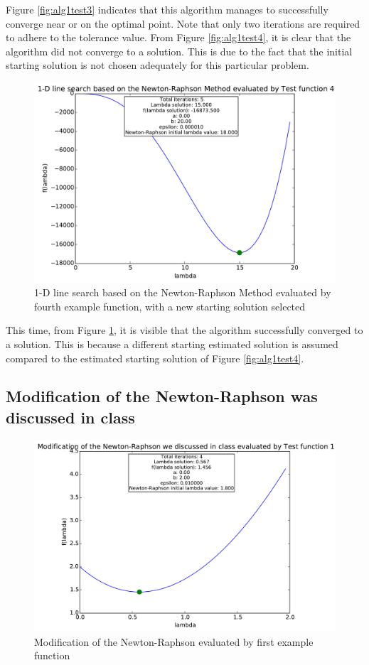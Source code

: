 \documentclass[a4paper,10pt]{article}
\begin{document}
Figure \ref{fig:alg1test3} indicates that this algorithm manages to successfully converge near or on the optimal point. Note that only two iterations are required to adhere to the tolerance value. From Figure \ref{fig:alg1test4}, it is clear that the algorithm did not converge to a solution. This is due to the fact that the initial starting solution is not chosen adequately for this particular problem. 

\newpage
\begin{figure}[h]
\centering
 \includegraphics[scale=0.55]{./graphs/algorithm1/x90percentofb/testFunction4.pdf} 
 \caption{1-D line search based on the Newton-Raphson Method evaluated by fourth example function, with a new starting solution selected}
 \label{fig:alg1test4B}
\end{figure}

This time, from Figure \ref{fig:alg1test4B}, it is visible that the algorithm successfully converged to a solution. This is because a different starting estimated solution is assumed compared to the estimated starting solution of Figure \ref{fig:alg1test4}.

\newpage
\subsection{Modification of the Newton-Raphson was discussed in class}
\begin{figure}[h]
\centering
 \includegraphics[scale=0.55]{./graphs/algorithm2/x90percentofb/testFunction1.pdf} 
 \caption{Modification of the Newton-Raphson evaluated by first example function}
 \label{fig:alg2test1}
\end{figure}
\end{document}
